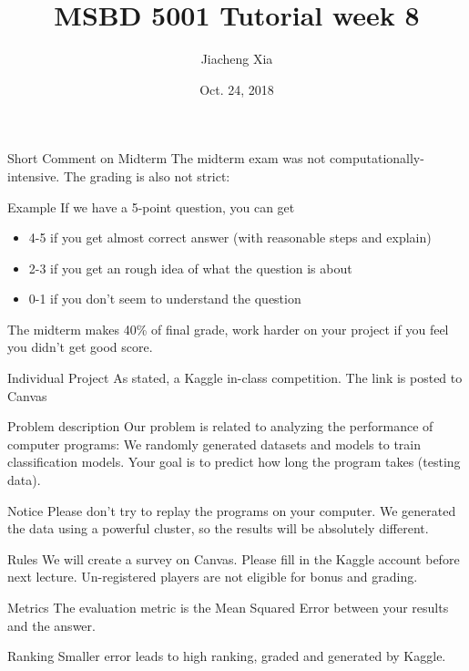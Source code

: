 \documentclass{beamer}
\title{MSBD 5001 Tutorial week 8}
\author{Jiacheng Xia}
\date{Oct. 24, 2018}
\begin{document}
\maketitle
	\begin{frame}{Short Comment on Midterm}
	The midterm exam was not computationally-intensive. The grading is also not strict:
	
	\begin{block}{Example}
	If we have a 5-point question, you can get 
		\begin{itemize}	
		\item 4-5 if you get almost correct answer (with reasonable steps and explain)
		\item 2-3 if you get an rough idea of what the question is about
		\item 0-1 if you don't seem to understand the question
 		\end{itemize}
	\end{block}
	
	\begin{alertblock}{}
	The midterm makes 40\% of final grade, work harder on your project if you feel you didn't get good score.  	
	\end{alertblock}
	\end{frame}
	
	\begin{frame}{Individual Project}
	As stated, a Kaggle in-class competition. The link is posted to Canvas
	\begin{block}{Problem description}
	Our problem is related to analyzing the performance of computer programs: We randomly generated datasets and models to train classification models. Your goal is to predict how long the program takes (testing data).
	\end{block}
	
	\begin{alertblock}{Notice}
		Please don't try to replay the programs on your computer. We generated the data using a powerful cluster, so the results will be absolutely different. 
	\end{alertblock}
	\end{frame}
	
	\begin{frame}{Rules}
	We will create a survey on Canvas. Please fill in the Kaggle account before next lecture. Un-registered players are not eligible for bonus and grading. 
	
	\begin{exampleblock}{Metrics}
		The evaluation metric is the Mean Squared Error between your results and the answer.  
	\end{exampleblock}
	
	\begin{exampleblock}{Ranking}
		Smaller error leads to high ranking, graded and generated by Kaggle.	
	\end{exampleblock}
	\end{frame}
	
\end{document}
